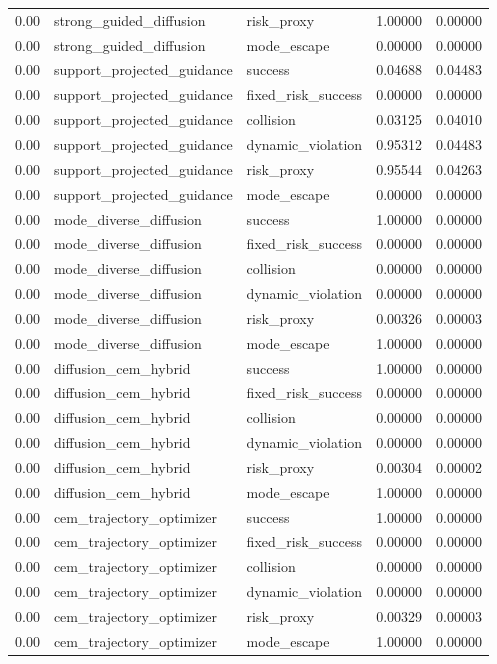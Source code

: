 \documentclass{article}
\begin{document}
\begin{table}[tbp]
{\begin{tabular}{lllll}
0.00 & strong\_guided\_diffusion & risk\_proxy & 1.00000 & 0.00000 \\
0.00 & strong\_guided\_diffusion & mode\_escape & 0.00000 & 0.00000 \\
0.00 & support\_projected\_guidance & success & 0.04688 & 0.04483 \\
0.00 & support\_projected\_guidance & fixed\_risk\_success & 0.00000 & 0.00000 \\
0.00 & support\_projected\_guidance & collision & 0.03125 & 0.04010 \\
0.00 & support\_projected\_guidance & dynamic\_violation & 0.95312 & 0.04483 \\
0.00 & support\_projected\_guidance & risk\_proxy & 0.95544 & 0.04263 \\
0.00 & support\_projected\_guidance & mode\_escape & 0.00000 & 0.00000 \\
0.00 & mode\_diverse\_diffusion & success & 1.00000 & 0.00000 \\
0.00 & mode\_diverse\_diffusion & fixed\_risk\_success & 0.00000 & 0.00000 \\
0.00 & mode\_diverse\_diffusion & collision & 0.00000 & 0.00000 \\
0.00 & mode\_diverse\_diffusion & dynamic\_violation & 0.00000 & 0.00000 \\
0.00 & mode\_diverse\_diffusion & risk\_proxy & 0.00326 & 0.00003 \\
0.00 & mode\_diverse\_diffusion & mode\_escape & 1.00000 & 0.00000 \\
0.00 & diffusion\_cem\_hybrid & success & 1.00000 & 0.00000 \\
0.00 & diffusion\_cem\_hybrid & fixed\_risk\_success & 0.00000 & 0.00000 \\
0.00 & diffusion\_cem\_hybrid & collision & 0.00000 & 0.00000 \\
0.00 & diffusion\_cem\_hybrid & dynamic\_violation & 0.00000 & 0.00000 \\
0.00 & diffusion\_cem\_hybrid & risk\_proxy & 0.00304 & 0.00002 \\
0.00 & diffusion\_cem\_hybrid & mode\_escape & 1.00000 & 0.00000 \\
0.00 & cem\_trajectory\_optimizer & success & 1.00000 & 0.00000 \\
0.00 & cem\_trajectory\_optimizer & fixed\_risk\_success & 0.00000 & 0.00000 \\
0.00 & cem\_trajectory\_optimizer & collision & 0.00000 & 0.00000 \\
0.00 & cem\_trajectory\_optimizer & dynamic\_violation & 0.00000 & 0.00000 \\
0.00 & cem\_trajectory\_optimizer & risk\_proxy & 0.00329 & 0.00003 \\
0.00 & cem\_trajectory\_optimizer & mode\_escape & 1.00000 & 0.00000 \\
\bottomrule
\end{tabular}
}
\end{table}
\end{document}
